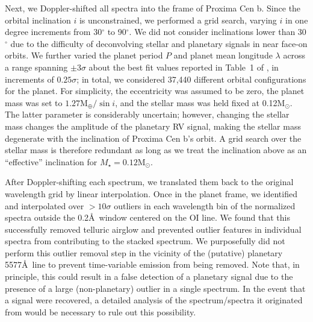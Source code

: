 \documentclass{emulateapj}
\begin{document}
Next, we Doppler-shifted all spectra into the frame of Proxima Cen b. Since the orbital inclination $i$ is unconstrained, we performed a grid search, varying $i$ in one degree increments from 30$^\circ$ to 90$^\circ$. We did not consider inclinations lower than 30$^\circ$ due to the difficulty of deconvolving stellar and planetary signals in near face-on orbits. We further varied the planet period $P$ and planet mean longitude $\lambda$ across a range spanning $\pm 3\sigma$ about the best fit values reported in Table~1 of \citet{Anglada-Escude2016}, in increments of $0.25\sigma$; in total, we considered 37,440 different orbital configurations for the planet. For simplicity, the eccentricity was assumed to be zero, the planet mass was set to $1.27\mathrm{M_\oplus}/\sin i$, and the stellar mass was held fixed at 0.12$\mathrm{M_\odot}$. The latter parameter is considerably uncertain; however, changing the stellar mass changes the amplitude of the planetary RV signal, making the stellar mass degenerate with the inclination of Proxima Cen b's orbit. A grid search over the stellar mass is therefore redundant as long as we treat the inclination above as an ``effective'' inclination for $M_\star = 0.12\mathrm{M_\odot}$.

After Doppler-shifting each spectrum, we translated them back to the original wavelength grid by linear interpolation. Once in the planet frame, we identified and interpolated over $> 10 \sigma$ outliers in each wavelength bin of the normalized spectra outside the 0.2\AA\ window centered on the OI line. We found that this successfully removed telluric airglow and prevented outlier features in individual spectra from contributing to the stacked spectrum. We purposefully did not perform this outlier removal step in the vicinity of the (putative) planetary 5577\AA\ line to prevent time-variable emission from being removed. Note that, in principle, this could result in a false detection of a planetary signal due to the presence of a large (non-planetary) outlier in a single spectrum. In the event that a signal were recovered, a detailed analysis of the spectrum/spectra it originated from would be necessary to rule out this possibility.

\end{document}
